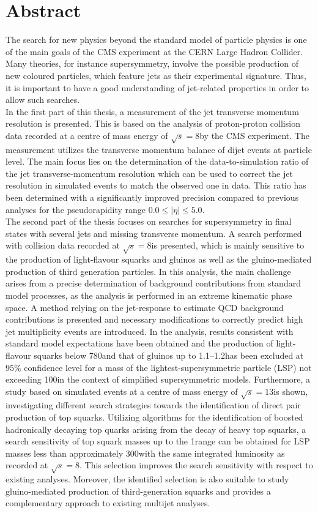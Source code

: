 \section*{Abstract}
The search for new physics beyond the standard model of particle physics is one of the main goals of the CMS experiment at the CERN Large Hadron Collider. Many theories, for instance supersymmetry, involve the possible production of new coloured particles, which feature jets as their experimental signature. Thus, it is important to have a good understanding of jet-related properties in order to allow such searches.\\
In the first part of this thesis, a measurement of the jet transverse momentum resolution is presented. This is based on the analysis of proton-proton collision data recorded at a centre of mass energy of $\sqrt{s}=8$\tev by the CMS experiment. The measurement utilizes the transverse momentum balance of dijet events at particle level. The main focus lies on the determination of the data-to-simulation ratio of the jet transverse-momentum resolution which can be used to correct the jet resolution in simulated events to match the observed one in data. This ratio has been determined with a significantly improved precision compared to previous analyses for the pseudorapidity range $0.0 \leq |\eta| \leq 5.0$. \\ 
The second part of the thesis focuses on searches for supersymmetry in final states with several jets and missing transverse momentum. A search performed with collision data recorded at $\sqrt{s}=8$\tev is presented, which is mainly sensitive to the production of light-flavour squarks and gluinos as well as the gluino-mediated production of third generation particles. In this analysis, the main challenge arises from a precise determination of background contributions from standard model processes, as the analysis is performed in an extreme kinematic phase space. A method relying on the jet-\pt response to estimate QCD background contributions is presented and necessary modifications to correctly predict high jet multiplicity events are introduced. In the analysis, results consistent with standard model expectations have been obtained and the production of light-flavour squarks below 780\gev and that of gluinos up to 1.1--1.2\tev has been excluded at $95\%$ confidence level for a mass of the lightest-supersymmetric particle (LSP) not exceeding 100\gev in the context of simplified supersymmetric models. Furthermore, a study based on simulated events at a centre of mass energy of  $\sqrt{s}=13$\tev is shown, investigating different search strategies towards the identification of direct pair production of top squarks. Utilizing algorithms for the identification of boosted hadronically decaying top quarks arising from the decay of heavy top squarks, a search sensitivity of top squark masses up to the 1\tev range can be obtained for LSP masses less than approximately 300\gev with the same integrated luminosity as recorded at $\sqrt{s}=8$\tev. This selection improves the search sensitivity with respect to existing analyses. Moreover, the identified selection is also suitable to study gluino-mediated production of third-generation squarks and provides a complementary approach to existing multijet analyses.      
